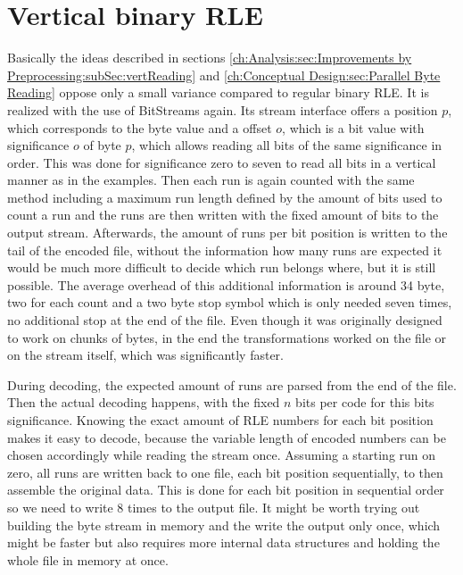 \section{Vertical binary RLE}
\label{ch:Implementation:vertical rle}
\par{
	Basically the ideas described in sections \ref{ch:Analysis:sec:Improvements by Preprocessing:subSec:vertReading} and \ref{ch:Conceptual Design:sec:Parallel Byte Reading} oppose only a small variance compared to regular binary RLE. It is realized with the use of BitStreams again. Its stream interface offers a position $p$, which corresponds to the byte value and a offset $o$, which is a bit value with significance $o$ of byte $p$, which allows reading all bits of the same significance in order. This was done for significance zero to seven to read all bits in a vertical manner as in the examples. Then each run is again counted with the same method including a maximum run length defined by the amount of bits used to count a run and the runs are then written with the fixed amount of bits to the output stream. Afterwards, the amount of runs per bit position is written to the tail of the encoded file, without the information how many runs are expected it would be much more difficult to decide which run belongs where, but it is still possible. The average overhead of this additional information is around 34 byte, two for each count and a two byte stop symbol which is only needed seven times, no additional stop at the end of the file. Even though it was originally designed to work on chunks of bytes, in the end the transformations worked on the file or on the stream itself, which was significantly faster.
}
\par{
	During decoding, the expected amount of runs are parsed from the end of the file. Then the actual decoding happens, with the fixed $n$ bits per code for this bits significance. Knowing the exact amount of RLE numbers for each bit position makes it easy to decode, because the variable length of encoded numbers can be chosen accordingly while reading the stream once. Assuming a starting run on zero, all runs are written back to one file, each bit position sequentially, to then assemble the original data. This is done for each bit position in sequential order so we need to write 8 times to the output file. It might be worth trying out building the byte stream in memory and the write the output only once, which might be faster but also requires more internal data structures and holding the whole file in memory at once.
}
